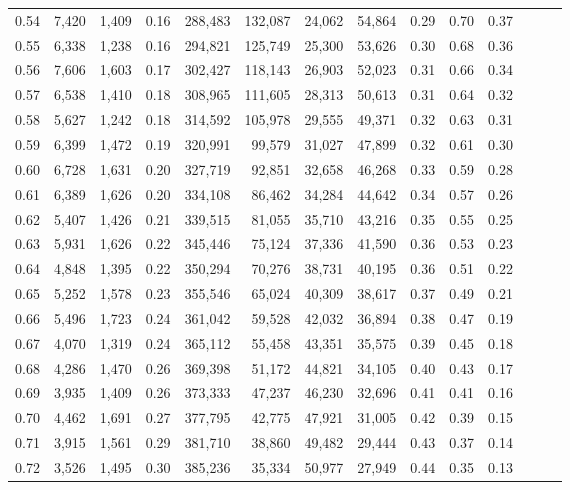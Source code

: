 \begin{tabular}{rrrrrrrrrrrrrr}
0.54 &  7,420 &  1,409 &  0.16 &  288,483 &  132,087 &  24,062 &  54,864 &  0.29 &  0.70 &      0.37 \\
0.55 &  6,338 &  1,238 &  0.16 &  294,821 &  125,749 &  25,300 &  53,626 &  0.30 &  0.68 &      0.36 \\
0.56 &  7,606 &  1,603 &  0.17 &  302,427 &  118,143 &  26,903 &  52,023 &  0.31 &  0.66 &      0.34 \\
0.57 &  6,538 &  1,410 &  0.18 &  308,965 &  111,605 &  28,313 &  50,613 &  0.31 &  0.64 &      0.32 \\
0.58 &  5,627 &  1,242 &  0.18 &  314,592 &  105,978 &  29,555 &  49,371 &  0.32 &  0.63 &      0.31 \\
0.59 &  6,399 &  1,472 &  0.19 &  320,991 &   99,579 &  31,027 &  47,899 &  0.32 &  0.61 &      0.30 \\
0.60 &  6,728 &  1,631 &  0.20 &  327,719 &   92,851 &  32,658 &  46,268 &  0.33 &  0.59 &      0.28 \\
0.61 &  6,389 &  1,626 &  0.20 &  334,108 &   86,462 &  34,284 &  44,642 &  0.34 &  0.57 &      0.26 \\
0.62 &  5,407 &  1,426 &  0.21 &  339,515 &   81,055 &  35,710 &  43,216 &  0.35 &  0.55 &      0.25 \\
0.63 &  5,931 &  1,626 &  0.22 &  345,446 &   75,124 &  37,336 &  41,590 &  0.36 &  0.53 &      0.23 \\
0.64 &  4,848 &  1,395 &  0.22 &  350,294 &   70,276 &  38,731 &  40,195 &  0.36 &  0.51 &      0.22 \\
0.65 &  5,252 &  1,578 &  0.23 &  355,546 &   65,024 &  40,309 &  38,617 &  0.37 &  0.49 &      0.21 \\
0.66 &  5,496 &  1,723 &  0.24 &  361,042 &   59,528 &  42,032 &  36,894 &  0.38 &  0.47 &      0.19 \\
0.67 &  4,070 &  1,319 &  0.24 &  365,112 &   55,458 &  43,351 &  35,575 &  0.39 &  0.45 &      0.18 \\
0.68 &  4,286 &  1,470 &  0.26 &  369,398 &   51,172 &  44,821 &  34,105 &  0.40 &  0.43 &      0.17 \\
0.69 &  3,935 &  1,409 &  0.26 &  373,333 &   47,237 &  46,230 &  32,696 &  0.41 &  0.41 &      0.16 \\
0.70 &  4,462 &  1,691 &  0.27 &  377,795 &   42,775 &  47,921 &  31,005 &  0.42 &  0.39 &      0.15 \\
0.71 &  3,915 &  1,561 &  0.29 &  381,710 &   38,860 &  49,482 &  29,444 &  0.43 &  0.37 &      0.14 \\
0.72 &  3,526 &  1,495 &  0.30 &  385,236 &   35,334 &  50,977 &  27,949 &  0.44 &  0.35 &      0.13 \\

\end{tabular}
